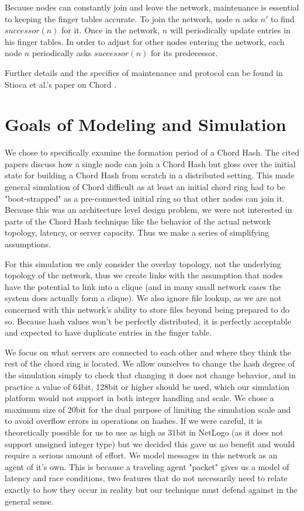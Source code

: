 \documentclass[12pt]{article} %
\begin{document}
Because nodes can constantly join and leave the network, maintenance is essential to keeping the finger tables accurate.  To join the network, node $n$ asks $n'$ to find $successor(n)$ for it.  Once in the network, $n$ will periodically update entries in his finger tables.  In order to adjust for other nodes entering the network, each node $n$ periodically asks $successor(n)$ for its predecessor. 

Further details and the specifics of maintenance and protocol can be found in Stioca et al.'s paper on Chord \cite{Chord}.



\section{Goals of Modeling and Simulation}
We chose to specifically examine the formation period of a Chord Hash. The cited papers discuss how a single node can join a Chord Hash but gloss over the initial state for building a Chord Hash from scratch in a distributed setting. This made general simulation of Chord difficult as at least an initial chord ring had to be "boot-strapped" as a pre-connected initial ring so that other nodes can join it. Because this was an architecture level design problem, we were not interested in parts of the Chord Hash technique like the behavior of the actual network topology, latency, or server capacity. Thus we make a series of simplifying assumptions. 

For this simulation we only consider the overlay topology, not the underlying topology of the network, thus we create links with the assumption that nodes have the potential to link into a clique (and in many small network cases the system does actually form a clique). We also ignore file lookup, as we are not concerned with this network's ability to store files beyond being prepared to do so. Because hash values won't be perfectly distributed, it is perfectly acceptable and expected to have duplicate entries in the finger table. 

We focus on what servers are connected to each other and where they think the rest of the chord ring is located. We allow ourselves to change the hash degree of the simulation simply to check that changing it does not change behavior, and in practice a value of 64bit, 128bit or higher should be used, which our simulation platform would not support in both integer handling and scale. We chose a maximum size of 20bit for the dual purpose of limiting the simulation scale and to avoid overflow errors in operations on hashes. If we were careful, it is theoretically possible for us to use as high as 31bit in NetLogo (as it does not support unsigned integer type) but we decided this gave us no benefit and would require a serious amount of effort. We model messages in this network as an agent of it's own. This is because a traveling agent "packet" gives us a model of latency and race conditions, two features that do not necessarily need to relate exactly to how they occur in reality but our technique must defend against in the general sense.
\end{document}
